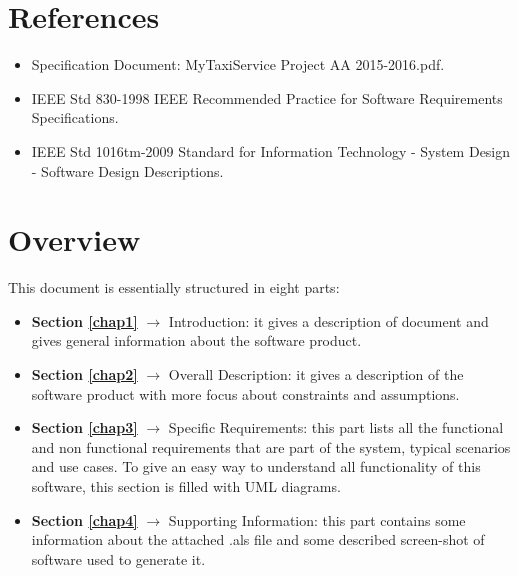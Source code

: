 \section{References}
\begin{itemize}
	\item Specification Document: MyTaxiService Project AA 2015-2016.pdf.
	\item IEEE Std 830-1998 IEEE Recommended Practice for Software Requirements Specifications.
	\item IEEE Std 1016tm-2009 Standard for Information Technology - System Design - Software Design Descriptions.
\end{itemize}

\section{Overview}
This document is essentially structured in eight parts:
\begin{itemize}
	\item \textbf{Section \ref{chap1}} $\rightarrow$ Introduction: it gives a description of document and gives general information about the software product.
	\item \textbf{Section \ref{chap2}} $\rightarrow$ Overall Description: it gives a description of the software product with more focus about constraints and assumptions.
	\item \textbf{Section \ref{chap3}} $\rightarrow$ Specific Requirements: this part lists all the functional and non functional requirements that are part of the system, typical scenarios and use cases. To give an easy way to understand all functionality of this software, this section is filled with UML diagrams.
	\item \textbf{Section \ref{chap4}} $\rightarrow$ Supporting Information: this part contains some information about the attached .als file and some described screen-shot of software used to generate it.
\end{itemize}